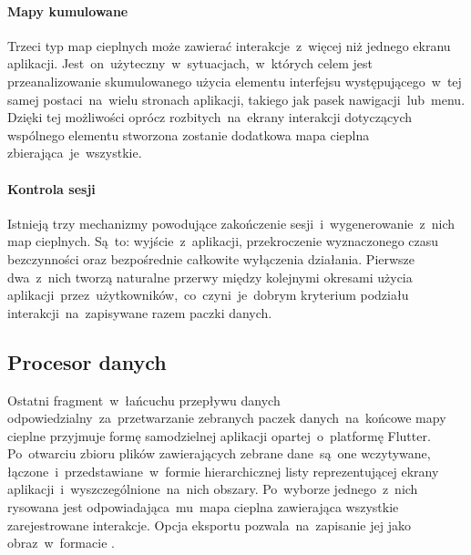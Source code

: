 \bigskip
{}

\paragraph{Mapy kumulowane} Trzeci typ map cieplnych może zawierać interakcje~z~więcej niż jednego ekranu aplikacji. Jest~on~użyteczny~w~sytuacjach,~w~których celem jest przeanalizowanie skumulowanego użycia elementu interfejsu występującego~w~tej samej postaci~na~wielu stronach aplikacji, takiego jak pasek nawigacji~lub~menu. Dzięki tej możliwości oprócz rozbitych~na~ekrany interakcji dotyczących wspólnego elementu stworzona zostanie dodatkowa mapa cieplna zbierająca~je~wszystkie.

\bigskip
{}

\paragraph{Kontrola sesji}
Istnieją trzy mechanizmy powodujące zakończenie sesji~i~wygenerowanie~z~nich map cieplnych. Są~to: wyjście~z~aplikacji, przekroczenie wyznaczonego czasu bezczynności oraz bezpośrednie całkowite wyłączenia działania. Pierwsze dwa~z~nich tworzą naturalne przerwy między kolejnymi okresami użycia aplikacji~przez~użytkowników,~co~czyni~je~dobrym kryterium podziału interakcji~na~zapisywane razem paczki danych.

\newcommand*\circled[1]{\tikz[baseline=(char.base)]{\node[shape=circle,draw,inner sep=1.2pt] (char) {#1};}}

\subsection{Procesor danych}
Ostatni fragment~w~łańcuchu przepływu danych odpowiedzialny~za~przetwarzanie zebranych paczek danych~na~końcowe mapy cieplne przyjmuje formę samodzielnej aplikacji opartej~o~platformę Flutter. Po~otwarciu zbioru plików zawierających zebrane dane~są~one wczytywane, łączone~i~przedstawiane~w~formie hierarchicznej listy reprezentującej ekrany aplikacji~i~wyszczególnione~na~nich obszary. Po~wyborze jednego~z~nich rysowana jest odpowiadająca~mu~mapa cieplna zawierająca wszystkie zarejestrowane interakcje. Opcja eksportu pozwala~na~zapisanie jej jako obraz~w~formacie .

\bigskip
{}

